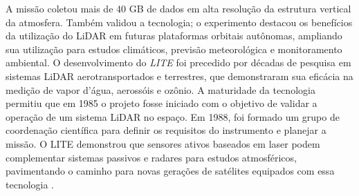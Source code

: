 A missão coletou mais de 40 GB de dados em alta resolução da estrutura vertical da atmosfera.
Também validou a tecnologia; o experimento destacou os benefícios da utilização do LiDAR em futuras plataformas orbitais autônomas, ampliando sua utilização para estudos climáticos, previsão meteorológica e monitoramento ambiental.
O desenvolvimento do \emph{LITE} foi precedido por décadas de pesquisa em sistemas LiDAR aerotransportados e terrestres, que demonstraram sua eficácia na medição de vapor d'água, aerossóis e ozônio.
A maturidade da tecnologia permitiu que em 1985 o projeto fosse iniciado com o objetivo de validar a operação de um sistema LiDAR no espaço.
Em 1988, foi formado um grupo de coordenação científica para definir os requisitos do instrumento e planejar a missão.
O LITE demonstrou que sensores ativos baseados em laser podem complementar sistemas passivos e radares para estudos atmosféricos, pavimentando o caminho para novas gerações de satélites equipados com essa tecnologia \cite{winker1996}.

